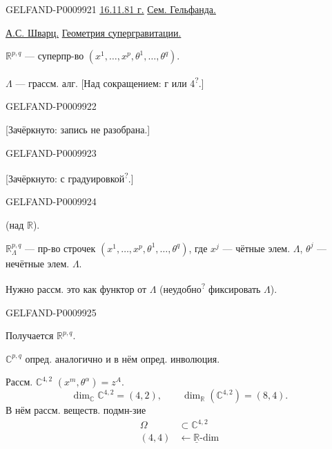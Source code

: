 \begin{GelfandAdjacentEvidence}{GELFAND-P000992}{1}
\underline{\underline{16.11.81 г.}} \qquad \underline{Сем. Гельфанда.}

\underline{\underline{А.С. Шварц.}} \qquad \underline{Геометрия супергравитации.}

$\mathbb R^{p,q}$ --- суперпр-во\qquad
$(x^1,\ldots,x^p,\theta^1,\ldots,\theta^q)$.

$\Lambda$ --- грассм. алг.
[Над сокращением: г или 4\textsuperscript{?}.]
\end{GelfandAdjacentEvidence}
\begin{GelfandAdjacentEvidence}{GELFAND-P000992}{2}

[Зачёркнуто: запись не разобрана.]
\end{GelfandAdjacentEvidence}
\begin{GelfandAdjacentEvidence}{GELFAND-P000992}{3}

[Зачёркнуто: с градуировкой\textsuperscript{?}.]
\end{GelfandAdjacentEvidence}
\begin{GelfandAdjacentEvidence}{GELFAND-P000992}{4}

(над $\mathbb R$).

$\mathbb R^{p,q}_{\Lambda}$ --- пр-во строчек
$(x^1,\ldots,x^p,\theta^1,\ldots,\theta^q)$,
где $x^j$ --- чётные элем. $\Lambda$, $\theta^j$ --- нечётные элем. $\Lambda$.

Нужно рассм. это как функтор от $\Lambda$ (неудобно\textsuperscript{?} фиксировать $\Lambda$).
\end{GelfandAdjacentEvidence}
\begin{GelfandAdjacentEvidence}{GELFAND-P000992}{5}


Получается $\mathbb R^{p,q}$.

$\mathbb C^{p,q}$ опред. аналогично и в нём опред. инволюция.

\medskip
Рассм. $\mathbb C^{4,2}$ \qquad $(x^m,\theta^\alpha)=z^A$.
\[
\dim_{\mathbb C}\mathbb C^{4,2}=(4,2),\qquad
\dim_{\mathbb R}(\mathbb C^{4,2})=(8,4).
\]
В нём рассм. веществ. подмн-зие
\[
\begin{array}{cl}
\Omega & \subset\mathbb C^{4,2}\\[-1pt]
(4,4)&\leftarrow\underline{\mathbb R}\text{-dim}
\end{array}
\]
\end{GelfandAdjacentEvidence}


